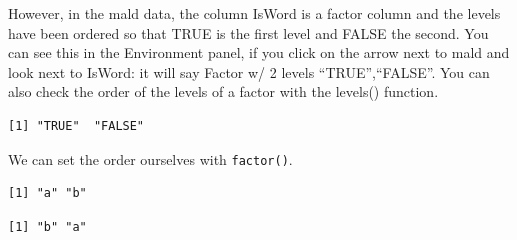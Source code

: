 \documentclass[
  letterpaper,
  DIV=11,
  numbers=noendperiod]{scrartcl}
\newenvironment{Shaded}{\begin{snugshade}}{\end{snugshade}}
\newcommand{\AttributeTok}[1]{\textcolor[rgb]{0.40,0.45,0.13}{#1}}
\newcommand{\FunctionTok}[1]{\textcolor[rgb]{0.28,0.35,0.67}{#1}}
\newcommand{\NormalTok}[1]{\textcolor[rgb]{0.00,0.23,0.31}{#1}}
\newcommand{\OtherTok}[1]{\textcolor[rgb]{0.00,0.23,0.31}{#1}}
\newcommand{\SpecialCharTok}[1]{\textcolor[rgb]{0.37,0.37,0.37}{#1}}
\newcommand{\StringTok}[1]{\textcolor[rgb]{0.13,0.47,0.30}{#1}}
\begin{document}
However, in the mald data, the column IsWord is a factor column and the
levels have been ordered so that TRUE is the first level and FALSE the
second. You can see this in the Environment panel, if you click on the
arrow next to mald and look next to IsWord: it will say Factor w/ 2
levels ``TRUE'',``FALSE''. You can also check the order of the levels of
a factor with the levels() function.

\begin{Shaded}
\end{Shaded}

\begin{verbatim}
[1] "TRUE"  "FALSE"
\end{verbatim}

We can set the order ourselves with \texttt{factor()}.

\begin{Shaded}
\end{Shaded}

\begin{verbatim}
[1] "a" "b"
\end{verbatim}

\begin{Shaded}
\end{Shaded}

\begin{verbatim}
[1] "b" "a"
\end{verbatim}
\end{document}
